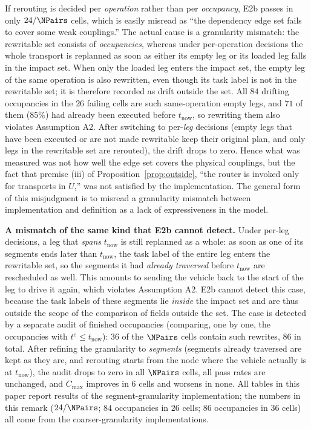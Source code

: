 \begin{remark}
\label{rem:e2b_history}
If rerouting is decided per \emph{operation} rather than per \emph{occupancy}, E2b passes in only \(24/\NPairs\) cells,
which is easily misread as ``the dependency edge set fails to cover some weak couplings.'' The actual cause is a granularity mismatch: the rewritable set consists of \emph{occupancies},
whereas under per-operation decisions the whole transport is replanned as soon as either its empty leg or its loaded leg falls in the impact set.
When only the loaded leg enters the impact set, the empty leg of the same operation is also rewritten, even though its task label is not in the rewritable set;
it is therefore recorded as drift outside the set. All \(84\) drifting occupancies in the \(26\) failing cells are such same-operation empty legs,
and \(71\) of them (\(85\%\)) had already been executed before \(t_{\mathrm{now}}\), so rewriting them also violates Assumption A2.
After switching to per-\emph{leg} decisions (empty legs that have been executed or are not made rewritable keep their original plan,
and only legs in the rewritable set are rerouted), the drift drops to zero.
Hence what was measured was not how well the edge set covers the physical couplings, but the fact that premise (iii) of Proposition~\ref{prop:outside},
``the router is invoked only for transports in \(U\),'' was not satisfied by the implementation.
The general form of this misjudgment is to misread a granularity mismatch between implementation and definition as a lack of expressiveness in the model.

\textbf{A mismatch of the same kind that E2b cannot detect.} Under per-leg decisions, a leg that \emph{spans}
\(t_{\mathrm{now}}\) is still replanned as a whole: as soon as one of its segments ends later than
\(t_{\mathrm{now}}\), the task label of the entire leg enters the rewritable set, so the segments it had \emph{already traversed} before
\(t_{\mathrm{now}}\) are rescheduled as well. This amounts to sending the vehicle back to the start of the leg to drive it again, which violates Assumption A2.
E2b cannot detect this case, because the task labels of these segments lie \emph{inside} the impact set and are thus outside the scope of the comparison of fields outside the set.
The case is detected by a separate audit of finished occupancies (comparing, one by one, the occupancies with \(t^e\le t_{\mathrm{now}}\)):
\(36\) of the \(\NPairs\) cells contain such rewrites, \(86\) in total.
After refining the granularity to \emph{segments} (segments already traversed are kept as they are, and rerouting starts from the node where the vehicle actually is at
\(t_{\mathrm{now}}\)), the audit drops to zero in all \(\NPairs\) cells,
all pass rates are unchanged, and \(C_{\max}\) improves in \(6\) cells and worsens in none.
All tables in this paper report results of the segment-granularity implementation; the numbers in this remark (\(24/\NPairs\); \(84\) occupancies in \(26\) cells; \(86\) occupancies in \(36\) cells)
all come from the coarser-granularity implementations.
\end{remark}

